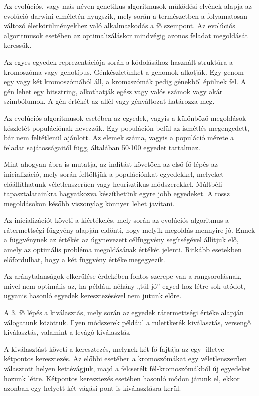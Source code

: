 \documentclass[12ppt,a4paper,oneside]{report}
\begin{document}
Az evolúciós, vagy más néven genetikus algoritmusok működési elvének alapja az evolúció darwini elméletén nyugszik, mely során a természetben a folyamatosan változó életkörülményekhez való alkalmazkodás a fő szempont. Az evolúciós algoritmusok esetében az optimalizáláskor mindvégig azonos feladat megoldását keressük.

Az egyes egyedek reprezentációja során a kódolásához használt struktúra a kromoszóma vagy genotípus. Génkészletünket a genomok alkotják. Egy genom egy vagy két kromoszómából áll, a kromoszómák pedig génekből épülnek fel. A gén lehet egy bitsztring, alkothatják egész vagy valós számok vagy akár szimbólumok. A gén értékét az allél vagy génváltozat határozza meg.

Az evolúciós algoritmusok esetében az egyedek, vagyis a különböző megoldások készletét populációnak nevezzük. Egy populáción belül az ismétlés megengedett, bár nem feltétlenül ajánlott. Az elemek száma, vagyis a populáció mérete a feladat sajátosságaitól függ, általában 50-100 egyedet tartalmaz.


Mint ahogyan  ábra is mutatja, az indítást követően az első fő lépés az inicializáció, mely során feltöltjük a populációnkat egyedekkel, melyeket előállíthatunk véletlenszerűen vagy heurisztikus módszerekkel. Múltbéli tapasztalatainkra hagyatkozva készíthetünk egyre jobb egyedeket. A rossz megoldásokon később viszonylag könnyen lehet javítani. 

Az inicializációt követi a kiértékelés, mely során az evolúciós algoritmus a rátermettségi függvény alapján eldönti, hogy melyik megoldás mennyire jó. Ennek a függvénynek az értékét az úgynevezett célfüggvény segítségével állítjuk elő, amely az optimális probléma megoldásának értékét jelenti. Ritkább esetekben előfordulhat, hogy a két függvény értéke megegyezik.

Az aránytalanságok elkerülése érdekében fontos szerepe van a rangsorolásnak, mivel nem optimális az, ha például néhány „túl jó” egyed hoz létre sok utódot, ugyanis hasonló egyedek keresztezésével nem jutunk előre.

A 3. fő lépés a kiválasztás, mely során az egyedek rátermettségi értéke alapján válogatunk közöttük. Ilyen módszerek például a rulettkerék kiválasztás, versengő kiválasztás, valamint a levágó kiválasztás.

A kiválasztást követi a keresztezés, melynek két fő fajtája az egy- illetve kétpontos keresztezés. Az előbbi esetében a kromoszómákat egy véletlenszerűen választott helyen kettévágjuk, majd a felcserélt fél-kromoszómákból új egyedeket hozunk létre. Kétpontos keresztezés esetében hasonló módon járunk el, ekkor azonban egy helyett két vágási pont is kiválasztásra kerül.
\end{document}
